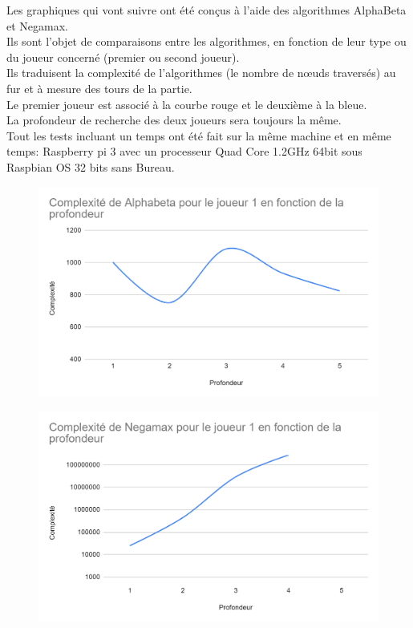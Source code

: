 \documentclass[12pt]{article}
\begin{document}
Les graphiques qui vont suivre ont été conçus à l’aide des algorithmes AlphaBeta et Negamax.\\
Ils sont l’objet de comparaisons entre les algorithmes, en fonction de leur type ou du joueur concerné (premier ou second joueur).\\
Ils traduisent la complexité de l’algorithmes (le nombre de nœuds traversés) au fur et à mesure des tours de la partie.\\
Le premier joueur est associé à la courbe rouge et le deuxième à la bleue.\\
La profondeur de recherche des deux joueurs sera toujours la même.\\

Tout les tests incluant un temps ont été fait sur la même machine et en même temps: Raspberry pi 3 avec un processeur Quad Core 1.2GHz 64bit sous Raspbian OS 32 bits sans Bureau.
\newpage

\begin{figure}[!h]
   \includegraphics[width=\textwidth]{alphabeta.png}
\end{figure}

\begin{figure}[!h]
   \includegraphics[width=\textwidth]{negamax.png}
\end{figure}
\end{document}
